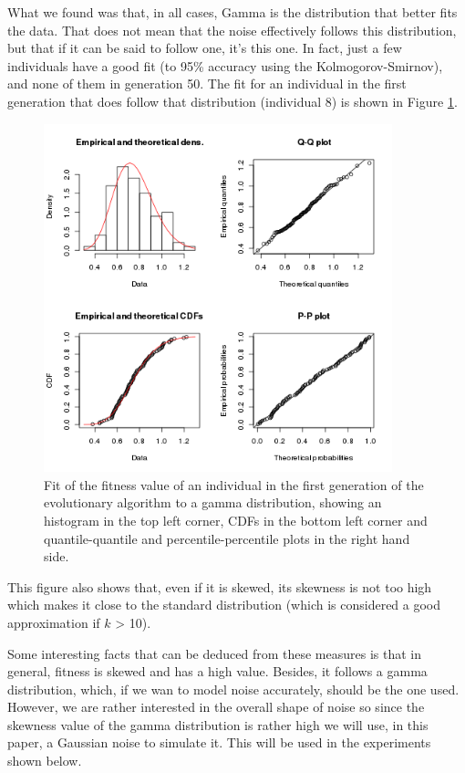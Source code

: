 \documentclass{llncs}
\begin{document}
What we found was that, in all cases, Gamma is the distribution that
better fits the data. That does not mean that the noise effectively
follows this distribution, but that if it can be said to follow one,
it's this one. In fact, just a few individuals have a good fit (to
95\% accuracy using the Kolmogorov-Smirnov), and none of them in
generation 50. The fit for an individual in the first generation that
does follow that distribution (individual 8) is shown in Figure
\ref{fig:indi8}. 
%
\begin{figure}[h]
\centering
\includegraphics[width=0.9\textwidth]{../images/indi8.png}
\caption{Fit of the fitness value of an individual in the first
  generation of the evolutionary algorithm to a gamma distribution,
  showing an histogram in the top left corner, CDFs in the bottom left
  corner and quantile-quantile and percentile-percentile plots in the
  right hand side. \label{fig:indi8}}
\end{figure}

This figure also shows that, even if it is skewed, its skewness is not
too high which makes it close to the standard distribution (which is
considered a good
approximation if $k$ > 10). 

Some interesting facts that can be deduced from these measures is that
in general, fitness is skewed and has a high value. Besides, it
follows a gamma distribution, which, if we wan to model noise
accurately, should be the one used. However, we are rather interested
in the overall shape of noise so since the skewness value of the gamma
distribution is rather high we will use, in this paper, a Gaussian
noise to simulate it. This will be used in the experiments shown
below. 
\end{document}
